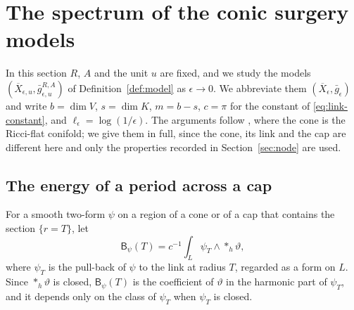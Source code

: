 \section{The spectrum of the conic surgery models}\label{sec:spectrum}

In this section $R$, $A$ and the unit $u$ are fixed, and we study the
models $(\overline X_{\epsilon,u},\bar g_{\epsilon,u}^{R,A})$ of
Definition~\ref{def:model} as $\epsilon\to0$. We abbreviate them
$(\overline X_\epsilon,\bar g_\epsilon)$ and write $b=\dim V$, $s=\dim K$,
$m=b-s$, $c=\pi$ for the constant of \eqref{eq:link-constant}, and
$\ell_\epsilon=\log(1/\epsilon)$. The arguments follow
\cite[Sections~4--6]{wuebben-conifold}, where the cone is the Ricci-flat
conifold; we give them in full, since the cone, its link and the cap are
different here and only the properties recorded in
Section~\ref{sec:node} are used.

\subsection{The energy of a period across a cap}
For a smooth two-form $\psi$ on a region of a cone or of a cap that
contains the section $\{r=T\}$, let
\begin{equation}\label{eq:boundary-coefficient}
 \mathsf B_\psi(T)=c^{-1}\int_{L}\psi_T\wedge*_h\vartheta ,
\end{equation}
where $\psi_T$ is the pull-back of $\psi$ to the link at radius $T$,
regarded as a form on $L$. Since $*_h\vartheta$ is closed, $\mathsf
B_\psi(T)$ is the coefficient of $\vartheta$ in the harmonic part of
$\psi_T$, and it depends only on the class of $\psi_T$ when $\psi_T$ is
closed.

